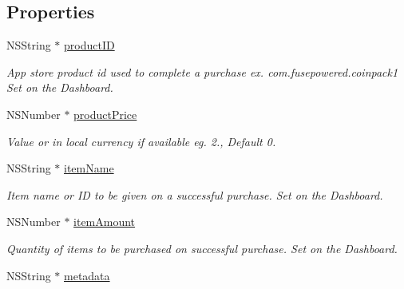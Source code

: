 \subsection*{Properties}
\begin{DoxyCompactItemize}
\item 
\hypertarget{interface_fuse_i_a_p_offer_object_a571e791fe7952e6d533affcd141cf8d3}{}N\+S\+String $\ast$ \hyperlink{interface_fuse_i_a_p_offer_object_a571e791fe7952e6d533affcd141cf8d3}{product\+I\+D}\label{interface_fuse_i_a_p_offer_object_a571e791fe7952e6d533affcd141cf8d3}

\begin{DoxyCompactList}\small\item\em App store product id used to complete a purchase ex. com.\+fusepowered.\+coinpack1 Set on the Dashboard. \end{DoxyCompactList}\item 
\hypertarget{interface_fuse_i_a_p_offer_object_a8d1ea52ddcdc454acacd66c011a43341}{}N\+S\+Number $\ast$ \hyperlink{interface_fuse_i_a_p_offer_object_a8d1ea52ddcdc454acacd66c011a43341}{product\+Price}\label{interface_fuse_i_a_p_offer_object_a8d1ea52ddcdc454acacd66c011a43341}

\begin{DoxyCompactList}\small\item\em Value or in local currency if available eg. 2., Default 0. \end{DoxyCompactList}\item 
\hypertarget{interface_fuse_i_a_p_offer_object_afc44eae0ea1010ef7b02515dfc156e68}{}N\+S\+String $\ast$ \hyperlink{interface_fuse_i_a_p_offer_object_afc44eae0ea1010ef7b02515dfc156e68}{item\+Name}\label{interface_fuse_i_a_p_offer_object_afc44eae0ea1010ef7b02515dfc156e68}

\begin{DoxyCompactList}\small\item\em Item name or I\+D to be given on a successful purchase. Set on the Dashboard. \end{DoxyCompactList}\item 
\hypertarget{interface_fuse_i_a_p_offer_object_a3eb537b8ee870de5085c035c1de25a31}{}N\+S\+Number $\ast$ \hyperlink{interface_fuse_i_a_p_offer_object_a3eb537b8ee870de5085c035c1de25a31}{item\+Amount}\label{interface_fuse_i_a_p_offer_object_a3eb537b8ee870de5085c035c1de25a31}

\begin{DoxyCompactList}\small\item\em Quantity of items to be purchased on successful purchase. Set on the Dashboard. \end{DoxyCompactList}\item 
\hypertarget{interface_fuse_i_a_p_offer_object_afc36b7d289310bebbe7a9979348c1a0b}{}N\+S\+String $\ast$ \hyperlink{interface_fuse_i_a_p_offer_object_afc36b7d289310bebbe7a9979348c1a0b}{metadata}\label{interface_fuse_i_a_p_offer_object_afc36b7d289310bebbe7a9979348c1a0b}


\end{DoxyCompactItemize}
